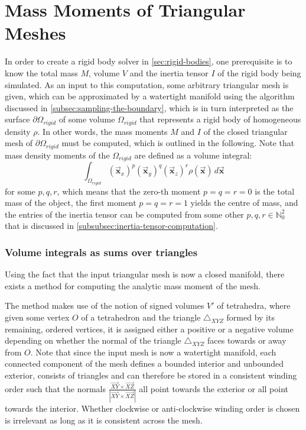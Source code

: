 \documentclass[oneside, a4paper]{book}
\newcommand\abs[1]{\left|#1\right|}
\newcommand\vek[1]{\vec{\bm{#1}}}
\newcommand\br[1]{\left(#1\right)}
\begin{document}
    \section{Mass Moments of Triangular Meshes}\label{sec:mass-moments}
    In order to create a rigid body solver in \autoref{sec:rigid-bodies}, one prerequisite is to know the total mass $M$, volume $V$ and the inertia tensor $I$ of the rigid body being simulated. As an input to this computation, some arbitrary triangular mesh is given, which can be approximated by a watertight manifold using the algorithm discussed in \autoref{subsec:sampling-the-boundary}, which is in turn interpreted as the surface $\partial\Omega_{rigid}$ of some volume $\Omega_{rigid}$ that represents a rigid body of homogeneous density $\rho$. In other words, the mass moments $M$ and $I$ of the closed triangular mesh of $\partial\Omega_{rigid}$ must be computed, which is outlined in the following. Note that mass density moments of the $\Omega_{rigid}$ are defined as a volume integral:
    \begin{equation}
      \int_{\Omega_{rigid}} \br{\vek{x}_x}^p \br{\vek{x}_y}^q \br{\vek{x}_z}^r \rho\br{\vek{x}} \, d\vek{x}
    \end{equation}
    for some $p,q,r$, which means that the zero-th moment $p=q=r=0$ is the total mass of the object, the first moment $p=q=r=1$ yields the centre of mass, and the entries of the inertia tensor can be computed from some other $p,q,r \in \mathds{N}_0^2$ that is discussed in \autoref{subsubsec:inertia-tensor-computation}.

    \subsubsection{Volume integrals as sums over triangles}
    
    Using the fact that the input triangular mesh is now a closed manifold, there exists a method for computing the analytic mass moment of the mesh. 
    
    The method makes use of the notion of signed volumes $V'$ of tetrahedra, where given some vertex $O$ of a tetrahedron and the triangle $\triangle_{XYZ}$ formed by its remaining, ordered vertices, it is assigned either a positive or a negative volume depending on whether the normal of the triangle $\triangle_{XYZ}$ faces towards or away from $O$. Note that since the input mesh is now a watertight manifold, each connected component of the mesh defines a bounded interior and unbounded exterior, consists of triangles and can therefore be stored in a consistent winding order such that the normals $\frac{\overrightarrow{XY} \times \overrightarrow{XZ}}{\abs{\overrightarrow{XY} \times \overrightarrow{XZ}}}$ all point towards the exterior or all point towards the interior. Whether clockwise or anti-clockwise winding order is chosen is irrelevant as long as it is consistent across the mesh.
    
\end{document}
